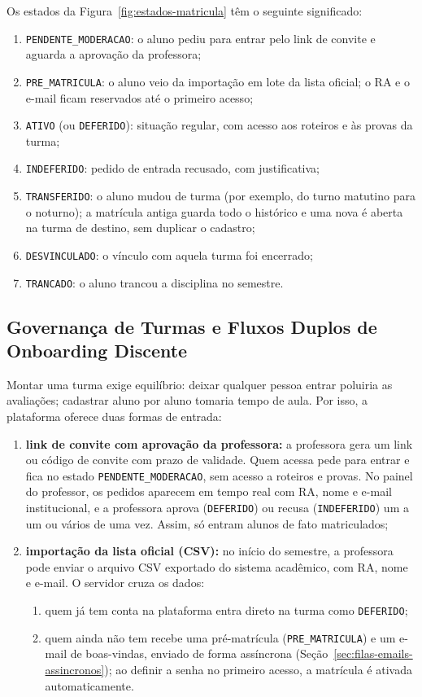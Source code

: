 Os estados da Figura~\ref{fig:estados-matricula} têm o seguinte significado:
\begin{enumerate}
    \item \texttt{PENDENTE\_MODERACAO}: o aluno pediu para entrar pelo link de convite e aguarda a aprovação da professora;
    \item \texttt{PRE\_MATRICULA}: o aluno veio da importação em lote da lista oficial; o RA e o e-mail ficam reservados até o primeiro acesso;
    \item \texttt{ATIVO} (ou \texttt{DEFERIDO}): situação regular, com acesso aos roteiros e às provas da turma;
    \item \texttt{INDEFERIDO}: pedido de entrada recusado, com justificativa;
    \item \texttt{TRANSFERIDO}: o aluno mudou de turma (por exemplo, do turno matutino para o noturno); a matrícula antiga guarda todo o histórico e uma nova é aberta na turma de destino, sem duplicar o cadastro;
    \item \texttt{DESVINCULADO}: o vínculo com aquela turma foi encerrado;
    \item \texttt{TRANCADO}: o aluno trancou a disciplina no semestre.
\end{enumerate}

\subsection{Governança de Turmas e Fluxos Duplos de Onboarding Discente}
\label{sec:onboarding-discente}

Montar uma turma exige equilíbrio: deixar qualquer pessoa entrar poluiria as avaliações; cadastrar aluno por aluno tomaria tempo de aula. Por isso, a plataforma oferece duas formas de entrada:

\begin{enumerate}
    \item \textbf{link de convite com aprovação da professora:} a professora gera um link ou código de convite com prazo de validade. Quem acessa pede para entrar e fica no estado \texttt{PENDENTE\_MODERACAO}, sem acesso a roteiros e provas. No painel do professor, os pedidos aparecem em tempo real com RA, nome e e-mail institucional, e a professora aprova (\texttt{DEFERIDO}) ou recusa (\texttt{INDEFERIDO}) um a um ou vários de uma vez. Assim, só entram alunos de fato matriculados;
    \item \textbf{importação da lista oficial (CSV):} no início do semestre, a professora pode enviar o arquivo CSV exportado do sistema acadêmico, com RA, nome e e-mail. O servidor cruza os dados:
    \begin{enumerate}
        \item quem já tem conta na plataforma entra direto na turma como \texttt{DEFERIDO};
        \item quem ainda não tem recebe uma pré-matrícula (\texttt{PRE\_MATRICULA}) e um e-mail de boas-vindas, enviado de forma assíncrona (Seção~\ref{sec:filas-emails-assincronos}); ao definir a senha no primeiro acesso, a matrícula é ativada automaticamente.
    \end{enumerate}
\end{enumerate}


